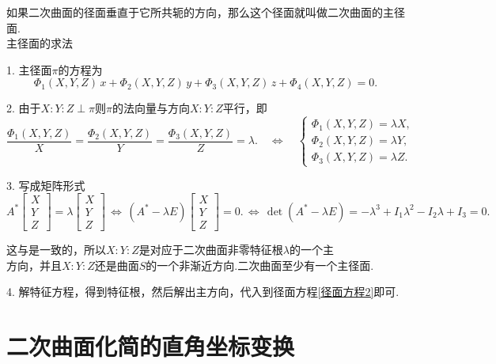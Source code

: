 如果二次曲面的径面垂直于它所共轭的方向，那么这个径面就叫做二次曲面的{\color{dy}主径面}.\\
{\color{dy}主径面的求法}
	\par 1. 主径面$\pi $的方程为
	$$
	\varPhi_1(X,Y,Z) \, x+\varPhi_2(X,Y,Z) \, y+\varPhi_3(X,Y,Z) \, z +\varPhi_4(X,Y,Z)=0.
	$$
	\par 2. 由于$X:Y:Z \perp \pi  $则$\pi $的法向量与方向$X:Y:Z$平行，即
	\begin{equation}
	\frac{\varPhi_1(X,Y,Z)}{X}=\frac{\varPhi_2(X,Y,Z)}{Y}=\frac{\varPhi_3(X,Y,Z)}{Z}=\lambda.
	\quad
	\Longleftrightarrow
	\quad
	\begin{cases}
	\varPhi_1(X,Y,Z) = \lambda X,\\
	\varPhi_2(X,Y,Z) = \lambda Y,\\
	\varPhi_3(X,Y,Z) = \lambda Z.
	\end{cases}
	\end{equation}

	\par 3. 写成矩阵形式
	$$
	A^*
	\left[ 
	\begin{array}{c}
	X \\
	Y \\
	Z
	\end{array}
	\right] 
	=
	\lambda
	\left[ 
	\begin{array}{c}
	X \\
	Y \\
	Z
	\end{array}
	\right] 
	\,
	\Longleftrightarrow
	\,
	\left( A^*-\lambda E \right) 
		\left[ 
	\begin{array}{c}
	X \\
	Y \\
	Z
	\end{array}
	\right] 
	= 0.
	\,
	\Longleftrightarrow
	\,
	\det(A^* - \lambda E) = -\lambda^3 +I_1\lambda^2 - I_2\lambda + I_3 = 0.
	$$
\par 这与\link[二次曲面的特征方程]是一致的，所以\colorbox{文字底色}{$X:Y:Z$是对应于二次曲面非零特征根$\lambda$的一个主}\\ 
\colorbox{文字底色}{方向}，并且\colorbox{文字底色}{$X:Y:Z$还是曲面$S$的一个非渐近方向}.二次曲面至少有一个主径面.
\par 4. 解特征方程，得到特征根，然后解出主方向，代入到径面方程\eqref{径面方程2}即可.

\section{二次曲面化简的直角坐标变换}
